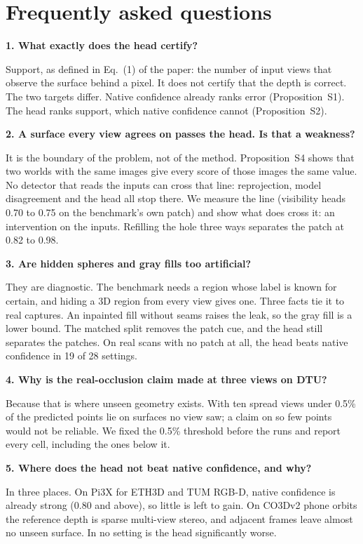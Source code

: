 \section{Frequently asked questions}
\label{sec:supp-faq}

\newcommand{\faq}[1]{\par\medskip\noindent\textbf{#1}\par\nobreak\smallskip\noindent}

\faq{1. What exactly does the head certify?}
Support, as defined in Eq.~(1) of the paper: the number of input views that observe the surface behind a pixel. It does not certify that the depth is correct. The two targets differ. Native confidence already ranks error (Proposition~S1). The head ranks support, which native confidence cannot (Proposition~S2).

\faq{2. A surface every view agrees on passes the head. Is that a weakness?}
It is the boundary of the problem, not of the method. Proposition~S4 shows that two worlds with the same images give every score of those images the same value. No detector that reads the inputs can cross that line: reprojection, model disagreement and the head all stop there. We measure the line (visibility heads 0.70 to 0.75 on the benchmark's own patch) and show what does cross it: an intervention on the inputs. Refilling the hole three ways separates the patch at \auroc{} 0.82 to 0.98.

\faq{3. Are hidden spheres and gray fills too artificial?}
They are diagnostic. The benchmark needs a region whose label is known for certain, and hiding a 3D region from every view gives one. Three facts tie it to real captures. An inpainted fill without seams raises the leak, so the gray fill is a lower bound. The matched split removes the patch cue, and the head still separates the patches. On real scans with no patch at all, the head beats native confidence in 19 of 28 settings.

\faq{4. Why is the real-occlusion claim made at three views on DTU?}
Because that is where unseen geometry exists. With ten spread views under 0.5\% of the predicted points lie on surfaces no view saw; a claim on so few points would not be reliable. We fixed the 0.5\% threshold before the runs and report every cell, including the ones below it.

\faq{5. Where does the head not beat native confidence, and why?}
In three places. On Pi3X for ETH3D and TUM RGB-D, native confidence is already strong (0.80 and above), so little is left to gain. On CO3Dv2 phone orbits the reference depth is sparse multi-view stereo, and adjacent frames leave almost no unseen surface. In no setting is the head significantly worse.

